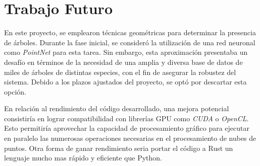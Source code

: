 \section{Trabajo Futuro}
En este proyecto, se emplearon técnicas geométricas para determinar la presencia de árboles. Durante la fase inicial, se consideró la utilización de una red neuronal como \textit{PointNet} \cite{pointnet} para esta tarea. Sin embargo, esta aproximación presentaba un desafío en términos de la necesidad de una amplia y diversa base de datos de miles de árboles de distintas especies, con el fin de asegurar la robustez del sistema. Debido a los plazos ajustados del proyecto, se optó por descartar esta opción.

En relación al rendimiento del código desarrollado, una mejora potencial consistiría en lograr compatibilidad con librerías GPU como \textit{CUDA} o \textit{OpenCL}. Esto permitiría aprovechar la capacidad de procesamiento gráfico para ejecutar en paralelo las numerosas operaciones necesarias en el procesamiento de nubes de puntos. Otra forma de ganar rendimiento seria portar el código a Rust un lenguaje mucho mas rápido y eficiente que Python.